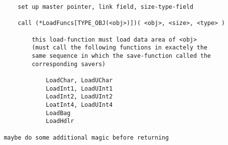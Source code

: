 \documentclass[11pt]{article}
\begin{document}
\begin{small}
\begin{verbatim}
        set up master pointer, link field, size-type-field

        call (*LoadFuncs[TYPE_OBJ(<obj>)])( <obj>, <size>, <type> )

            this load-function must load data area of <obj>
            (must call the following functions in exactely the
            same sequence in which the save-function called the
            corresponding savers)

                LoadChar, LoadUChar
                LoadInt1, LoadUInt1
                LoadInt2, LoadUInt2
                LoatInt4, LoadUInt4
                LoadBag
                LoadHdlr

    maybe do some additional magic before returning
\end{verbatim}
\end{small}
\end{document}
